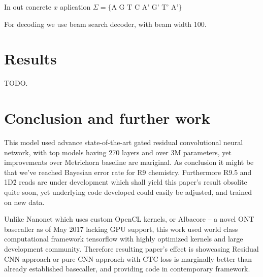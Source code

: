 \documentclass[times, utf8, seminar, numeric]{fer}
\begin{document}
In out concrete $x$ aplication $\Sigma = \{\text{A G T C A' G' T' A'}\}$

For decoding we use beam search decoder, with beam width 100.

\chapter{Results}

TODO.

\chapter{Conclusion and further work}

This model used advance state-of-the-art gated residual convolutional neural network, with top models having 270 layers and over 3M parameters, yet improvements over Metrichorn baseline are mariginal. As conclusion it might be that we've reached Bayesian error rate for R9 chemistry. Furthermore R9.5 and 1D\^2 reads are under development which shall yield this paper's result obsolite quite soon, yet underlying code developed could easily be adjusted, and trained on new data.

Unlike Nanonet which uses custom OpenCL kernels, or Albacore -- a novel ONT basecaller as of May 2017 lacking GPU support, this work used world class computational framework tensorflow with highly optimized kernels and large development community. Therefore resulting paper's effect is showcasing Residual CNN approach or pure CNN approach with CTC loss is marginally better than already established basecaller, and providing code in contemporary framework.



% 
\end{document}
